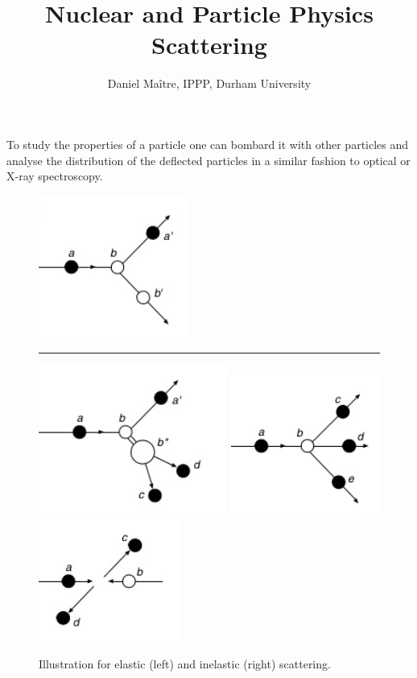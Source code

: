 \documentclass[12pt]{article}
\date{}
\title{\LARGE \bf Nuclear and Particle Physics\\[5mm]Scattering}
\author{Daniel Ma\^{i}tre, IPPP, Durham University}
\begin{document}

\maketitle
To study the properties of a particle one can bombard it with other particles and analyse the distribution of the deflected particles in a similar fashion to optical or X-ray spectroscopy. 

\begin{figure}[h]
\begin{center}
  \includegraphics[scale=0.4]{images/elastic.png}
 \rule{3cm}{0cm}  \includegraphics[scale=0.4,clip]{images/inelastic1.png} 
 \includegraphics[scale=0.4]{images/inelastic2.png} \includegraphics[scale=0.4]{images/inelastic3.png}
\end{center}
\caption{Illustration for elastic (left) and inelastic (right) scattering.}\label{fig:elasticinelastic}\end{figure}
\end{document}
